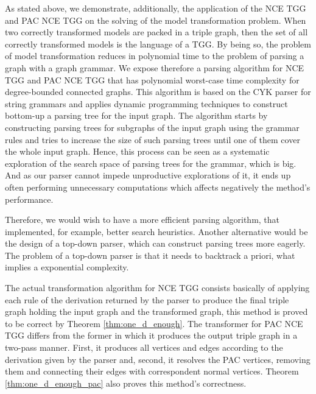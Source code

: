 As stated above, we demonstrate, additionally, the application of the NCE TGG and PAC NCE TGG on the solving of the model transformation problem. When two correctly transformed models are packed in a triple graph, then the set of all correctly transformed models is the language of a TGG. By being so, the problem of model transformation reduces in polynomial time to the problem of parsing a graph with a graph grammar. We expose therefore a parsing algorithm for NCE TGG \cite{rozenberg1986boundary} and PAC NCE TGG that has polynomial worst-case time complexity for degree-bounded connected graphs. This algorithm is based on the CYK parser for string grammars and applies dynamic programming techniques to construct bottom-up a parsing tree for the input graph. The algorithm starts by constructing parsing trees for subgraphs of the input graph using the grammar rules and tries to increase the size of such parsing trees until one of them cover the whole input graph. Hence, this process can be seen as a systematic exploration of the search space of parsing trees for the grammar, which is big. And as our parser cannot impede unproductive explorations of it, it ends up often performing unnecessary computations which affects negatively the method's performance.

Therefore, we would wish to have a more efficient parsing algorithm, that implemented, for example, better search heuristics. Another alternative would be the design of a top-down parser, which can construct parsing trees more eagerly. The problem of a top-down parser is that it needs to backtrack a priori, what implies a exponential complexity.
 
The actual transformation algorithm for NCE TGG consists basically of applying each rule of the derivation returned by the parser to produce the final triple graph holding the input graph and the transformed graph, this method is proved to be correct by Theorem \ref{thm:one_d_enough}. The transformer for PAC NCE TGG differs from the former in which it produces the output triple graph in a two-pass manner. First, it produces all vertices and edges according to the derivation given by the parser and, second, it resolves the PAC vertices, removing them and connecting their edges with correspondent normal vertices. Theorem \ref{thm:one_d_enough_pac} also proves this method's correctness.

